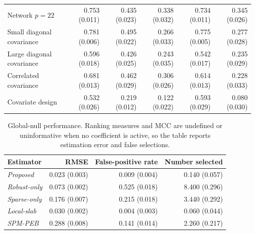 \begin{table}[htbp]
{\begin{tabular}{lrrrrr}
Network $p=22$ & 0.753 (0.011) & 0.435 (0.023) & 0.338 (0.032) & 0.734 (0.011) & 0.345 (0.026)\\ 
Small diagonal covariance & 0.781 (0.006) & 0.495 (0.022) & 0.266 (0.033) & 0.775 (0.005) & 0.277 (0.028)\\ 
Large diagonal covariance & 0.596 (0.018) & 0.426 (0.025) & 0.243 (0.035) & 0.542 (0.017) & 0.235 (0.029)\\ 
Correlated covariance & 0.681 (0.013) & 0.462 (0.029) & 0.306 (0.026) & 0.614 (0.013) & 0.228 (0.033)\\ 
Covariate design & 0.532 (0.026) & 0.219 (0.012) & 0.122 (0.022) & 0.593 (0.029) & 0.080 (0.030)\\ 
\bottomrule
\end{tabular}
}
\end{table}
 
\begin{table}[htbp]
\centering
\small
\setlength{\tabcolsep}{4pt}
\caption{Global-null performance. Ranking measures and MCC are undefined or uninformative when no coefficient is active, so the table reports estimation error and false selections.}
\label{tab:supp-global-null}
\begin{tabular}{lrrr}
\toprule
Estimator & RMSE & False-positive rate & Number selected\\
\midrule 
\emph{Proposed} & 0.023 (0.003) & 0.009 (0.004) & 0.140 (0.057)\\ 
\emph{Robust-only} & 0.073 (0.002) & 0.525 (0.018) & 8.400 (0.296)\\ 
\emph{Sparse-only} & 0.176 (0.007) & 0.215 (0.018) & 3.440 (0.292)\\ 
\emph{Local-slab} & 0.030 (0.002) & 0.004 (0.003) & 0.060 (0.044)\\ 
\emph{SPM-PEB} & 0.288 (0.008) & 0.141 (0.014) & 2.260 (0.217)\\ 
\bottomrule
\end{tabular}
\end{table}
 
